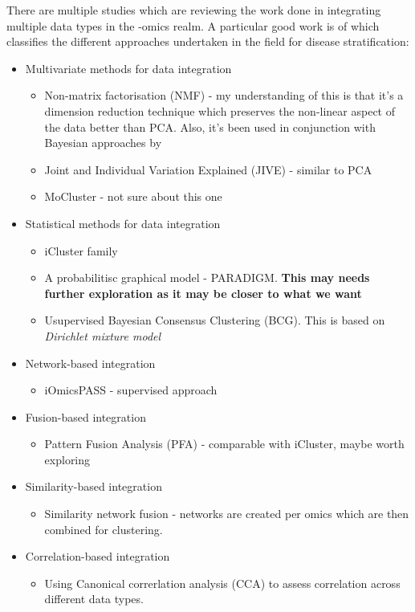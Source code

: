 There are multiple studies \citet{Menyhart2021-ef, Subramanian2020-tk, Picard2021-qr, Reel2021-sg} which are reviewing the work done in integrating multiple data types in the -omics realm. A particular good work is of \citet{Menyhart2021-ef} which classifies the different approaches undertaken in the field for disease stratification:
\begin{itemize}
    \item Multivariate methods for data integration
        \begin{itemize}
            \item Non-matrix factorisation (NMF) - my understanding of this is that it's a dimension reduction technique which preserves the non-linear aspect of the data better than PCA. Also, it's been used in conjunction with Bayesian approaches by \citet{Robertson2017-mg}
            \item Joint and Individual Variation Explained (JIVE) - similar to PCA
            \item MoCluster \cite{Meng2016-ui} - not sure about this one
        \end{itemize}
    \item Statistical methods for data integration
        \begin{itemize}
            \item iCluster family \citet{Shen2009-ew, Mo2013-zi, Mo2018-el}
            \item A probabilitisc graphical model - PARADIGM. \textbf{This may needs further exploration as it may be closer to what we want}
            \item Usupervised Bayesian Consensus Clustering (BCG). This is based on \textit{Dirichlet mixture model}
        \end{itemize}
    \item Network-based integration
        \begin{itemize}
            \item iOmicsPASS - supervised approach
        \end{itemize}
    \item Fusion-based integration
        \begin{itemize}
            \item Pattern Fusion Analysis (PFA) - comparable with iCluster, maybe worth exploring
        \end{itemize}
    \item Similarity-based integration
        \begin{itemize}
            \item Similarity network fusion - networks are created per omics which are then combined for clustering.
        \end{itemize}
    \item Correlation-based integration
        \begin{itemize}
            \item Using Canonical correrlation analysis (CCA) to assess correlation across different data types.
        \end{itemize}
\end{itemize}


